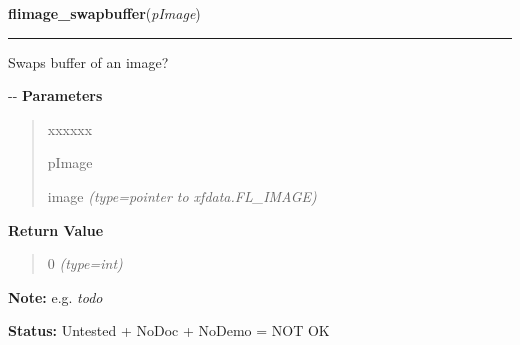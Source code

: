     \vspace{0.5ex}

\hspace{.8\funcindent}\begin{boxedminipage}{\funcwidth}

    \raggedright \textbf{flimage\_swapbuffer}(\textit{pImage})

    \vspace{-1.5ex}

    \rule{\textwidth}{0.5\fboxrule}
\setlength{\parskip}{2ex}

Swaps buffer of an image?

-{}-
\setlength{\parskip}{1ex}
      \textbf{Parameters}
      \vspace{-1ex}

      \begin{quote}
        \begin{Ventry}{xxxxxx}

          \item[pImage]


image
            {\it (type=pointer to xfdata.FL\_IMAGE)}

        \end{Ventry}

      \end{quote}

      \textbf{Return Value}
    \vspace{-1ex}

      \begin{quote}

0
      {\it (type=int)}

      \end{quote}

\textbf{Note:} 
e.g. \emph{todo}


\textbf{Status:} 
Untested + NoDoc + NoDemo = NOT OK


    \end{boxedminipage}

    \label{xformslib:flflimage:flimage_to_ximage}

    \vspace{0.5ex}

